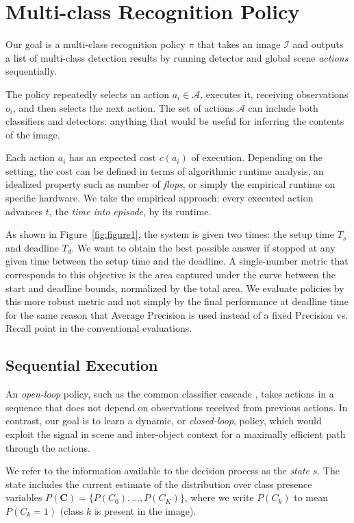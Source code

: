 
\section{Multi-class Recognition Policy} \label{sec:tech}

Our goal is a multi-class recognition policy $\pi$ that takes an image $\mathcal{I}$ and outputs a list of multi-class detection results by running detector and global scene \emph{actions} sequentially.

The policy repeatedly selects an action $a_i \in \mathcal{A}$, executes it, receiving observations $o_i$, and then selects the next action.
The set of actions $\mathcal{A}$ can include both classifiers and detectors: anything that would be useful for inferring the contents of the image.

Each action $a_i$ has an expected cost $c(a_i)$ of execution.
Depending on the setting, the cost can be defined in terms of algorithmic runtime analysis, an idealized property such as number of \emph{flops}, or simply the empirical runtime on specific hardware.
We take the empirical approach: every executed action advances $t$, the \emph{time into episode}, by its runtime.

As shown in Figure~\ref{fig:figure1}, the system is given two times: the setup time $T_s$ and deadline $T_d$.
We want to obtain the best possible answer if stopped at any given time between the setup time and the deadline.
A single-number metric that corresponds to this objective is the area captured under the curve between the start and deadline bounds, normalized by the total area.
We evaluate policies by this more robust metric and not simply by the final performance at deadline time for the same reason that Average Precision is used instead of a fixed Precision vs. Recall point in the conventional evaluations.

\subsection{Sequential Execution}
An \emph{open-loop} policy, such as the common classifier cascade \cite{Viola2001}, takes actions in a sequence that does not depend on observations received from previous actions.
In contrast, our goal is to learn a dynamic, or \emph{closed-loop}, policy, which would exploit the signal in scene and inter-object context for a maximally efficient path through the actions.

We refer to the information available to the decision process as the \emph{state} $s$.
The state includes the current estimate of the distribution over class presence variables $P(\mathbf{C}) = \{P(C_0), \ldots, P(C_K)\}$, where we write $P(C_k)$ to mean $P(C_k=1)$ (class $k$ is present in the image).

